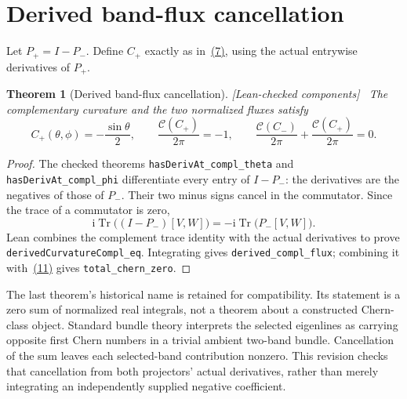 \documentclass[11pt]{article}
\newtheorem{theorem}{Theorem}[section]
\theoremstyle{definition}\newtheorem{definition}[theorem]{Definition}
\theoremstyle{remark}\newtheorem{remark}[theorem]{Remark}
\newcommand{\Tr}{\operatorname{Tr}}
\newcommand{\ii}{\mathrm{i}}
\newcommand{\checked}{\textnormal{\small[Lean-checked components]}\ }
\begin{document}
\section{Derived band-flux cancellation}
Let $P_+=I-P_-$. Define $C_+$ exactly as in~\hyperref[eq:derived]{(7)}, using the actual entrywise derivatives of $P_+$.
\begin{theorem}[Derived band-flux cancellation]\label{thm:bands}\checked
The complementary curvature and the two normalized fluxes satisfy
\hypertarget{eq:bandflux}{}
\begin{equation}
 C_+(\theta,\phi)=-\frac{\sin\theta}{2},\qquad
 \frac{\mathcal C(C_+)}{2\pi}=-1,\qquad
 \frac{\mathcal C(C_-)}{2\pi}+\frac{\mathcal C(C_+)}{2\pi}=0.
\end{equation}
\end{theorem}
\begin{proof}
The checked theorems \texttt{hasDerivAt\_compl\_theta} and \texttt{hasDerivAt\_compl\_phi} differentiate every entry of $I-P_-$: the derivatives are the negatives of those of $P_-$. Their two minus signs cancel in the commutator. Since the trace of a commutator is zero,
\[
 \ii\Tr\bigl((I-P_-)[V,W]\bigr)
 =-\ii\Tr\bigl(P_-[V,W]\bigr).
\]
Lean combines the complement trace identity with the actual derivatives to prove \texttt{derivedCurvatureCompl\_eq}. Integrating gives \texttt{derived\_compl\_flux}; combining it with~\hyperref[eq:derivedflux]{(11)} gives \texttt{total\_chern\_zero}.
\end{proof}
The last theorem's historical name is retained for compatibility. Its statement is a zero sum of normalized real integrals, not a theorem about a constructed Chern-class object. Standard bundle theory interprets the selected eigenlines as carrying opposite first Chern numbers in a trivial ambient two-band bundle. Cancellation of the sum leaves each selected-band contribution nonzero. This revision checks that cancellation from both projectors' actual derivatives, rather than merely integrating an independently supplied negative coefficient.
\end{document}
